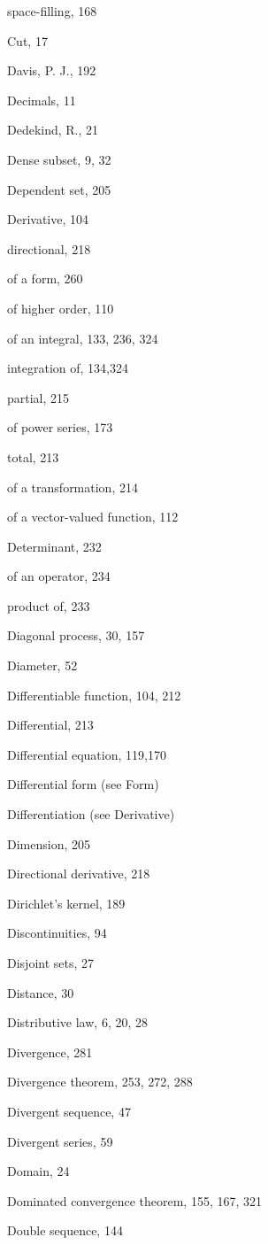 \documentclass[10pt]{article}
\begin{document}
space-filling, 168

Cut, 17

Davis, P. J., 192

Decimals, 11

Dedekind, R., 21

Dense subset, 9, 32

Dependent set, 205

Derivative, 104

directional, 218

of a form, 260

of higher order, 110

of an integral, 133, 236, 324

integration of, 134,324

partial, 215

of power series, 173

total, 213

of a transformation, 214

of a vector-valued function, 112

Determinant, 232

of an operator, 234

product of, 233

Diagonal process, 30, 157

Diameter, 52

Differentiable function, 104, 212

Differential, 213

Differential equation, 119,170

Differential form (see Form)

Differentiation (see Derivative)

Dimension, 205

Directional derivative, 218

Dirichlet's kernel, 189

Discontinuities, 94

Disjoint sets, 27

Distance, 30

Distributive law, 6, 20, 28

Divergence, 281

Divergence theorem, 253, 272, 288

Divergent sequence, 47

Divergent series, 59

Domain, 24

Dominated convergence theorem, 155, 167, 321

Double sequence, 144
\end{document}
